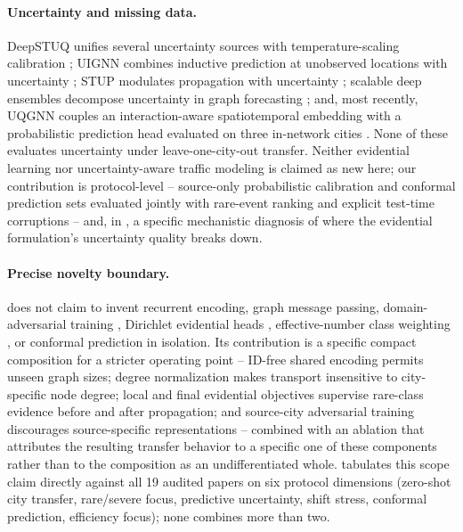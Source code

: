 \paragraph{Uncertainty and missing data.} DeepSTUQ unifies several uncertainty sources with
temperature-scaling calibration \citep{qian2022deepstuq}; UIGNN combines inductive prediction at
unobserved locations with uncertainty \citep{mei2023uignn}; STUP modulates propagation with
uncertainty \citep{jin2024stup}; scalable deep ensembles decompose uncertainty in graph forecasting
\citep{mallick2024ensemble}; and, most recently, UQGNN couples an interaction-aware spatiotemporal
embedding with a probabilistic prediction head evaluated on three in-network cities
\citep{yu2025uqgnn}. None of these evaluates uncertainty under leave-one-city-out transfer. Neither
evidential learning nor uncertainty-aware traffic modeling is claimed as new here; our contribution
is protocol-level -- source-only probabilistic calibration and conformal prediction sets evaluated
jointly with rare-event ranking and explicit test-time corruptions -- and, in , a
specific mechanistic diagnosis of where the evidential formulation's uncertainty quality breaks down.

\paragraph{Precise novelty boundary.} \methodname{} does not claim to invent recurrent encoding,
graph message passing, domain-adversarial training \citep{ganin2015dann}, Dirichlet evidential
heads \citep{sensoy2018evidential}, effective-number class weighting \citep{cui2019effectivenumber},
or conformal prediction \citep{angelopoulos2021gentle} in isolation. Its contribution is a specific
compact composition for a stricter operating point -- ID-free shared encoding permits unseen graph
sizes; degree normalization makes transport insensitive to city-specific node degree; local and
final evidential objectives supervise rare-class evidence before and after propagation; and
source-city adversarial training discourages source-specific representations -- combined with an
ablation that attributes the resulting transfer behavior to a specific one of these components
rather than to the composition as an undifferentiated whole.  tabulates
this scope claim directly against all 19 audited papers on six protocol dimensions (zero-shot
city transfer, rare/severe focus, predictive uncertainty, shift stress, conformal prediction,
efficiency focus); none combines more than two.
